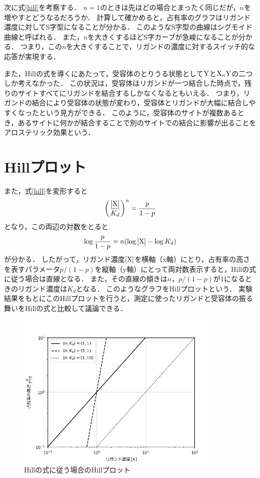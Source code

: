 次に式\eqref{hill}を考察する．
$n=1$のときは先ほどの場合とまったく同じだが，$n$を増やすとどうなるだろうか．
計算して確かめると，占有率のグラフはリガンド濃度に対してS字型になることが分かる．
このようなS字型の曲線はシグモイド曲線と呼ばれる．
また，$n$を大きくするほどS字カーブが急峻になることが分かる．
つまり，この$n$を大きくすることで，リガンドの濃度に対するスイッチ的な応答が実現する．

また，Hillの式を導くにあたって，受容体のとりうる状態として$\ce{Y}$と$\ce{X_{$n$}Y}$の二つしか考えなかった．
この状況は，受容体はリガンドが一つ結合した時点で，残りのサイトすべてにリガンドを結合するしかなくなるともいえる．
つまり，リガンドの結合により受容体の状態が変わり，受容体とリガンドが大幅に結合しやすくなったという見方ができる．
このように，受容体のサイトが複数あるとき，あるサイトに何かが結合することで別のサイトでの結合に影響が出ることをアロステリック効果という．


\section{Hillプロット}
また，式\eqref{hill}を変形すると
\begin{equation}
  \qty(\frac{[\ce{X}]}{K_d})^n = \frac{p}{1-p}
\end{equation}
となり，この両辺の対数をとると
\begin{equation}
  \log{\frac{p}{1-p}} = n\qty(\log{[\ce{X}]} - \log{K_d})
\end{equation}
が分かる．
したがって，リガンド濃度$[\ce{X}]$を横軸（x軸）にとり，占有率の高さを表すパラメータ$p/(1-p)$を縦軸（y軸）にとって両対数表示すると，Hillの式に従う場合は直線となる．
また，その直線の傾きは$n$，$p/(1-p)$が1になるときのリガンド濃度は$K_d$となる．
このようなグラフをHillプロットという．
実験結果をもとにこのHillプロットを行うと，測定に使ったリガンドと受容体の振る舞いをHillの式と比較して議論できる．

\begin{figure}[htbp]
  \centering
  \includegraphics[width=10cm]{hill_plot.png}
  \caption{Hillの式に従う場合のHillプロット}
  \label{fig:hill_plot}
\end{figure}

